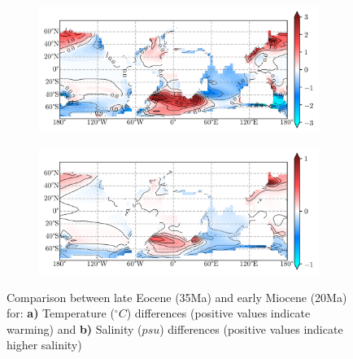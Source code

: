 \documentclass[a4paper]{article}
\begin{document}
\begin{figure}[H]
	\begin{subfigure}[b]{0.5\linewidth}
		\caption{}
		\label{fig:3520cooling}
		\includegraphics[width=\linewidth]{Paleo_eocene_35_20.png}
		
	\end{subfigure}
	\begin{subfigure}[b]{0.5\linewidth}
		\caption{}
		\label{fig:salt3520cooling}
		\includegraphics[width=\linewidth]{salt_35_20.png}
		
	\end{subfigure}
	\caption{ Comparison between late Eocene (35Ma) and early Miocene (20Ma) for: \textbf{a)} Temperature ($^{\circ}C$) differences (positive values indicate warming) and  \textbf{b)} Salinity ($psu$) differences (positive values indicate higher salinity)}
\end{figure}
\end{document}
